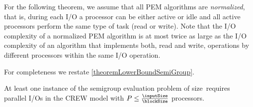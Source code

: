 \documentclass[envcountsame]{llncs}
\def\bOm#1{\printmath{\Omega \left(#1\right)}}
\begin{document}
For the following theorem, we assume that all PEM algorithms are {\em normalized}, that is, during each I/O a processor can be either active or idle and all active processors perform the same type of task (read or write). 
Note that the I/O complexity of a normalized PEM algorithm is at most twice as large as the I/O complexity of an algorithm that implements both, read and write, operations by different processors within the same I/O operation. 

For completeness we restate \autoref{theoremLowerBoundSemiGroup}.

\begin{theorem}
\label{theoremLowerBoundSemiGroupRestate} 
At least one instance of the semigroup evaluation problem of size~ requires \bOm{\permp{\inputSize,\memorySize,\blockSize}} parallel I/Os in the CREW \semigroupPEM model with $P\leq\frac{\inputSize}{\blockSize}$ processors.
\end{theorem}
\end{document}

